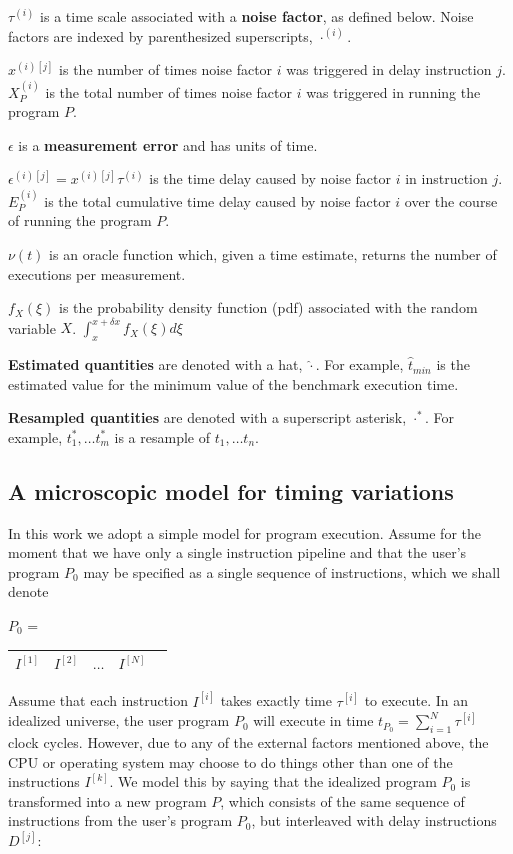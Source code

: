 \documentclass[conference]{IEEEtran}
\begin{document}
$\tau^{(i)}$ is a time scale associated with a \textbf{noise factor}, as defined below. Noise factors are indexed by parenthesized superscripts, $\cdot^{(i)}$.

$x^{(i)[j]}$ is the number of times noise factor $i$ was triggered in delay instruction $j$. $X_P^{(i)}$ is the total number of times noise factor $i$ was triggered in running the program $P$.

$\epsilon$ is a \textbf{measurement error} and has units of time.

$\epsilon^{(i)[j]} = x^{(i)[j]} \tau^{(i)}$ is the time delay caused by noise factor $i$ in instruction $j$. $E_P^{(i)}$ is the total cumulative time delay caused by noise factor $i$ over the course of running the program $P$.

$\nu(t)$ is an oracle function which, given a time estimate, returns the number of executions per measurement.

$f_X(\xi)$ is the probability density function (pdf) associated with the random variable $X$. $\int_{x}^{x+\delta x} f_X(\xi) d\xi$

\textbf{Estimated quantities} are denoted with a hat, $\hat\cdot$. For example, $\hat t_{min}$ is the estimated value for the minimum value of the benchmark execution time.

\textbf{Resampled quantities} are denoted with a superscript asterisk, $\cdot^*$. For example, $t^*_1, \dots t^*_m$ is a resample of $t_1, \dots t_n$.


\label{sec:statmodel}
\subsection{A microscopic model for timing variations}

In this work we adopt a simple model for program execution. Assume for the moment that we have only a single instruction pipeline and that the user's program $P_0$ may be specified as a single sequence of instructions, which we shall denote

$P_0$ = \begin{tabular}{|c|c|c|c|c|}
\hline
$I^{[1]}$ & $I^{[2]}$ & $\dots$ & $I^{[N]}$ \tabularnewline
\hline
\end{tabular}

Assume that each instruction $I^{[i]}$ takes exactly time $\tau^{[i]}$ to execute.
In an idealized universe, the user program $P_0$ will execute in time $t_{P_0} = \sum_{i=1}^N \tau^{[i]}$ clock cycles. However, due to any of the external factors mentioned above, the CPU or operating system may choose to do things other than one of the instructions $I^{[k]}$. We model this by saying that the idealized program $P_0$ is transformed into a new program $P$, which consists of the same sequence of instructions from the user's program $P_0$, but interleaved with delay instructions $D^{[j]}$:
\end{document}
